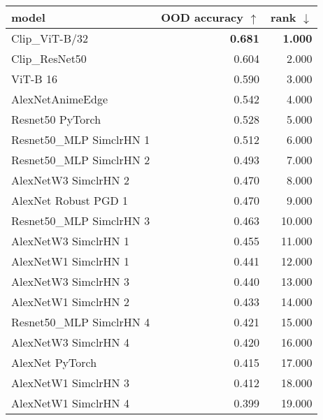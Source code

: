 \begin{tabular}{lrr}
\toprule
model & OOD accuracy $\uparrow$ & rank $\downarrow$ \\
\midrule
Clip\_ViT-B/32 & \textbf{0.681} & \textbf{1.000} \\
Clip\_ResNet50 & 0.604 & 2.000 \\
ViT-B 16 & 0.590 & 3.000 \\
AlexNetAnimeEdge & 0.542 & 4.000 \\
Resnet50 PyTorch & 0.528 & 5.000 \\
Resnet50\_MLP SimclrHN 1 & 0.512 & 6.000 \\
Resnet50\_MLP SimclrHN 2 & 0.493 & 7.000 \\
AlexNetW3 SimclrHN 2 & 0.470 & 8.000 \\
AlexNet Robust PGD 1 & 0.470 & 9.000 \\
Resnet50\_MLP SimclrHN 3 & 0.463 & 10.000 \\
AlexNetW3 SimclrHN 1 & 0.455 & 11.000 \\
AlexNetW1 SimclrHN 1 & 0.441 & 12.000 \\
AlexNetW3 SimclrHN 3 & 0.440 & 13.000 \\
AlexNetW1 SimclrHN 2 & 0.433 & 14.000 \\
Resnet50\_MLP SimclrHN 4 & 0.421 & 15.000 \\
AlexNetW3 SimclrHN 4 & 0.420 & 16.000 \\
AlexNet PyTorch & 0.415 & 17.000 \\
AlexNetW1 SimclrHN 3 & 0.412 & 18.000 \\
AlexNetW1 SimclrHN 4 & 0.399 & 19.000 \\
\bottomrule
\end{tabular}

